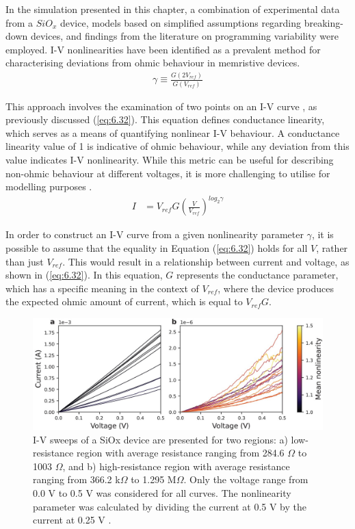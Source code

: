 In the simulation presented in this chapter, a combination of experimental data from a $SiO_x$ device, models based on simplified assumptions regarding breaking-down devices, and findings from the literature on programming variability were employed. I-V nonlinearities have been identified as a prevalent method for characterising deviations from ohmic behaviour in memristive devices.
\begin{align}
\gamma \equiv \frac{G\left( 2V_{ref} \right)}{G\left( V_{ref} \right)}  \label{eq:6.32}
\end{align}

\noindent This approach involves the examination of two points on an I-V curve \cite{lentz2013current}, as previously discussed (\ref{eq:6.32}). This equation defines conductance linearity, which serves as a means of quantifying nonlinear I-V behaviour. A conductance linearity value of 1 is indicative of ohmic behaviour, while any deviation from this value indicates I-V nonlinearity. While this metric can be useful for describing non-ohmic behaviour at different voltages, it is more challenging to utilise for modelling purposes \cite{sung2018effect}.
\begin{align}
I & = V_{ref}G\left ( \frac{V}{V_{ref}} \right )^{log_2 \gamma} \label{eq:6.33}
\end{align}

\noindent In order to construct an I-V curve from a given nonlinearity parameter $\gamma$, it is possible to assume that the equality in Equation (\ref{eq:6.32}) holds for all $V$, rather than just $V_{ref}$. This would result in a relationship between current and voltage, as shown in (\ref{eq:6.32}). In this equation, $G$ represents the conductance parameter, which has a specific meaning in the context of $V_{ref}$, where the device produces the expected ohmic amount of current, which is equal to $V_{ref} G$.\\

\begin{figure}[htbp!] 
\centering    
\includegraphics[width=1\textwidth]{Chapter6/Figs/h.png}
\caption[I-V sweeps of a SiOx device are presented for two regions]{I-V sweeps of a SiOx device are presented for two regions: a) low-resistance region with average resistance ranging from 284.6 $\Omega$ to 1003 $\Omega$, and b) high-resistance region with average resistance ranging from 366.2 k$\Omega$ to 1.295 M$\Omega$. Only the voltage range from 0.0 V to 0.5 V was considered for all curves. The nonlinearity parameter was calculated by dividing the current at 0.5 V by the current at 0.25 V \cite{joksas2022nonideality}.}
\label{fig:6h}
\end{figure}



